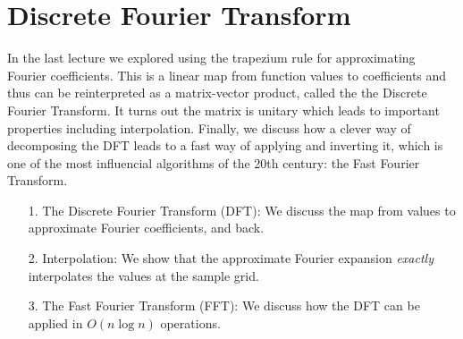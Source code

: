 
\section{Discrete Fourier Transform}
In the last lecture we explored using the trapezium rule for approximating Fourier coefficients. This is a linear map from function values to coefficients and thus can be reinterpreted as a matrix-vector product, called the the Discrete Fourier Transform. It turns out the matrix is unitary which leads to important properties including interpolation. Finally, we discuss how a clever way of decomposing the DFT leads to a fast way of applying and inverting it, which is one of the most influencial algorithms of the 20th century: the Fast Fourier Transform.

\begin{itemize}
\item[1. ] The Discrete Fourier Transform (DFT): We discuss the map from values to approximate Fourier coefficients, and back.


\item[2. ] Interpolation: We show that the approximate Fourier expansion \emph{exactly} interpolates the values at the sample grid.


\item[3. ] The Fast Fourier Transform (FFT): We discuss how the DFT can be applied in $O(n \log n)$ operations.

\end{itemize}
